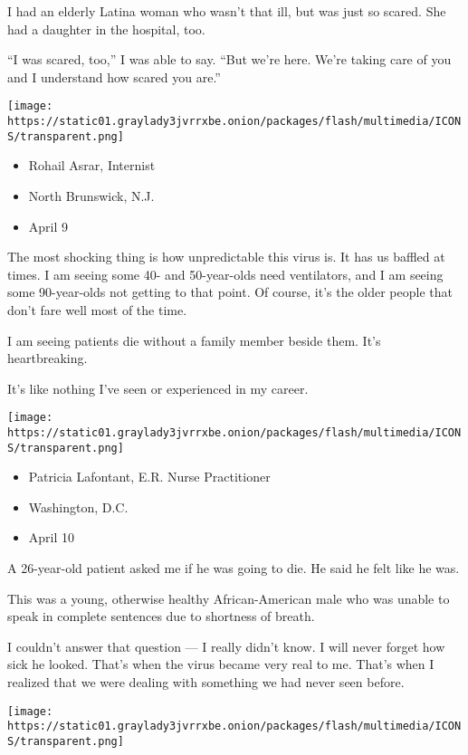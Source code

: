 I had an elderly Latina woman who wasn't that ill, but was just so
scared. She had a daughter in the hospital, too.

``I was scared, too,'' I was able to say. ``But we're here. We're taking
care of you and I understand how scared you are.''

\texttt{[image: https://static01.graylady3jvrrxbe.onion/packages/flash/multimedia/ICONS/transparent.png]}

\begin{itemize}
\tightlist
\item
  Rohail Asrar, Internist
\item
  North Brunswick, N.J.
\item
  April 9
\end{itemize}

The most shocking thing is how unpredictable this virus is. It has us
baffled at times. I am seeing some 40- and 50-year-olds need
ventilators, and I am seeing some 90-year-olds not getting to that
point. Of course, it's the older people that don't fare well most of the
time.

I am seeing patients die without a family member beside them. It's
heartbreaking.

It's like nothing I've seen or experienced in my career.

\texttt{[image: https://static01.graylady3jvrrxbe.onion/packages/flash/multimedia/ICONS/transparent.png]}

\begin{itemize}
\tightlist
\item
  Patricia Lafontant, E.R. Nurse Practitioner
\item
  Washington, D.C.
\item
  April 10
\end{itemize}

A 26-year-old patient asked me if he was going to die. He said he felt
like he was.

This was a young, otherwise healthy African-American male who was unable
to speak in complete sentences due to shortness of breath.

I couldn't answer that question --- I really didn't know. I will never
forget how sick he looked. That's when the virus became very real to me.
That's when I realized that we were dealing with something we had never
seen before.

\texttt{[image: https://static01.graylady3jvrrxbe.onion/packages/flash/multimedia/ICONS/transparent.png]}

